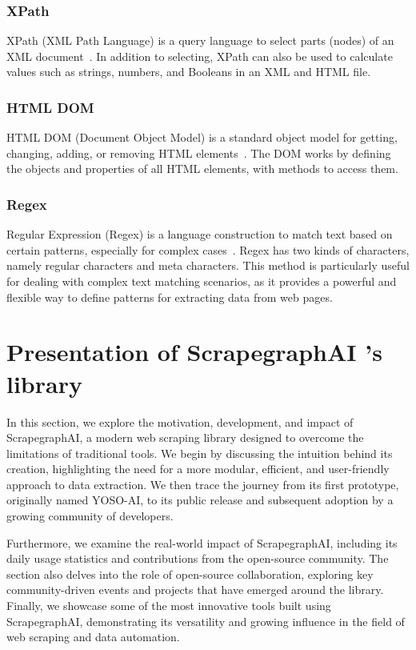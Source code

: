 \subsubsection{XPath}
XPath (XML Path Language) is a query language to select parts (nodes) of an XML document~\cite{8}. In addition to selecting, XPath can also be used to calculate values such as strings, numbers, and Booleans in an XML and HTML file.
\subsubsection{HTML DOM}
HTML DOM (Document Object Model) is a standard object model for getting, changing, adding, or removing HTML elements~\cite{8}. The DOM works by defining the objects and properties of all HTML elements, with methods to access them.
\subsubsection{Regex}
Regular Expression (Regex) is a language construction to match text based on certain patterns, especially for complex cases~\cite{8}. Regex has two kinds of characters, namely regular characters and meta characters. This method is particularly useful for dealing with complex text matching scenarios, as it provides a powerful and flexible way to define patterns for extracting data from web pages.

\clearpage
\section{Presentation of ScrapegraphAI ’s library}
In this section, we explore the motivation, development, and impact of ScrapegraphAI, a modern web scraping library designed to overcome the limitations of traditional tools. We begin by discussing the intuition behind its creation, highlighting the need for a more modular, efficient, and user-friendly approach to data extraction. We then trace the journey from its first prototype, originally named YOSO-AI, to its public release and subsequent adoption by a growing community of developers.

Furthermore, we examine the real-world impact of ScrapegraphAI, including its daily usage statistics and contributions from the open-source community. The section also delves into the role of open-source collaboration, exploring key community-driven events and projects that have emerged around the library. Finally, we showcase some of the most innovative tools built using ScrapegraphAI, demonstrating its versatility and growing influence in the field of web scraping and data automation.
